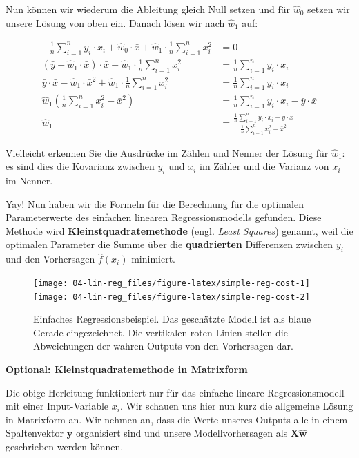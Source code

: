 \documentclass[
]{book}
\begin{document}
Nun können wir wiederum die Ableitung gleich Null setzen und für \(\hat{w}_0\) setzen wir unsere Lösung von oben ein. Danach lösen wir nach \(\hat{w}_1\) auf:

\begin{align}
-\frac{1}{n} \sum_{i=1}^{n} y_i \cdot x_i + \hat{w}_0 \cdot \bar{x} + \hat{w}_1 \cdot \frac{1}{n} \sum_{i=1}^{n} x_i^2 &= 0 \\
(\bar{y} - \hat{w}_1 \cdot \bar{x}) \cdot \bar{x} + \hat{w}_1 \cdot \frac{1}{n} \sum_{i=1}^{n} x_i^2 &= \frac{1}{n} \sum_{i=1}^{n} y_i \cdot x_i \\
\bar{y} \cdot \bar{x} - \hat{w}_1 \cdot \bar{x}^2 + \hat{w}_1 \cdot \frac{1}{n} \sum_{i=1}^{n} x_i^2 &= \frac{1}{n} \sum_{i=1}^{n} y_i \cdot x_i \\
\hat{w}_1 \left(\frac{1}{n} \sum_{i=1}^{n} x_i^2 - \bar{x}^2 \right) &= \frac{1}{n} \sum_{i=1}^{n} y_i \cdot x_i - \bar{y} \cdot \bar{x} \\
\hat{w}_1 &= \frac{\frac{1}{n} \sum_{i=1}^{n} y_i \cdot x_i - \bar{y} \cdot \bar{x}}{\frac{1}{n} \sum_{i=1}^{n} x_i^2 - \bar{x}^2}
\end{align}

Vielleicht erkennen Sie die Ausdrücke im Zählen und Nenner der Lösung für \(\hat{w}_1\): es sind dies die Kovarianz zwischen \(y_i\) und \(x_i\) im Zähler und die Varianz von \(x_i\) im Nenner.

Yay! Nun haben wir die Formeln für die Berechnung für die optimalen Parameterwerte des einfachen linearen Regressionsmodells gefunden. Diese Methode wird \textbf{Kleinstquadratemethode} (engl. \emph{Least Squares}) genannt, weil die optimalen Parameter die Summe über die \textbf{quadrierten} Differenzen zwischen \(y_i\) und den Vorhersagen \(\hat{f}(x_i)\) minimiert.

\begin{figure}

{\centering \texttt{[image: 04-lin-reg\_files/figure-latex/simple-reg-cost-1]} \texttt{[image: 04-lin-reg\_files/figure-latex/simple-reg-cost-2]} 

}

\caption{Einfaches Regressionsbeispiel. Das geschätzte Modell ist als blaue Gerade eingezeichnet. Die vertikalen roten Linien stellen die Abweichungen der wahren Outputs von den Vorhersagen dar.}\label{fig:simple-reg-cost}
\end{figure}

\textbf{Optional: Kleinstquadratemethode in Matrixform}

Die obige Herleitung funktioniert nur für das einfache lineare Regressionsmodell mit einer Input-Variable \(x_i\). Wir schauen uns hier nun kurz die allgemeine Lösung in Matrixform an. Wir nehmen an, dass die Werte unseres Outputs alle in einem Spaltenvektor \(\mathbf{y}\) organisiert sind und unsere Modellvorhersagen als \(\mathbf{X}\mathbf{\hat{w}}\) geschrieben werden können.
\end{document}
